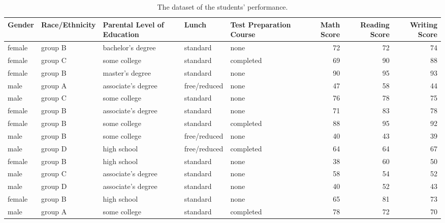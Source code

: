 \documentclass{article}
\begin{document}
	\begin{sidewaystable}[h!]
		\begin{center}
			\caption{The dataset of the students' performance.}
			\label{tab:table1}
			\begin{tabular}{|l|l|l|l|l|r|r|r|}
				\hline
				\cellcolor{blue!50}\textbf{Gender} & \cellcolor{blue!50}\cellcolor{blue!50}\textbf{Race/Ethnicity} & \cellcolor{blue!50}\textbf{Parental Level of Education} & \cellcolor{blue!50}\textbf{Lunch} & \cellcolor{blue!50}\textbf{Test Preparation Course} & \cellcolor{blue!50}\textbf{Math Score} & \cellcolor{blue!50}\textbf{Reading Score} & \cellcolor{blue!50}\textbf{Writing Score} \\
				\hline
				female & group B & bachelor's degree & standard & none & 72 & 72 & 74 \\
				\hline
				female & group C & some college & standard & completed & 69 & 90 & 88 \\
				\hline
				female & group B & master's degree & standard & none & 90 & 95 & 93 \\
				\hline
				male & group A & associate's degree & free/reduced & none & 47 & 58 & 44 \\
				\hline
				male & group C & some college & standard & none & 76 & 78 & 75 \\
				\hline
				female & group B & associate's degree & standard & none & 71 & 83 & 78 \\
				\hline
				female & group B & some college & standard & completed & 88 & 95 & 92 \\
				\hline
				male & group B & some college & free/reduced & none & 40 & 43 & 39 \\
				\hline
				male & group D & high school & free/reduced & completed & 64 & 64 & 67 \\
				\hline
				female & group B & high school & standard & none & 38 & 60 & 50 \\
				\hline
				male & group C & associate's degree & standard & none & 58 & 54 & 52 \\
				\hline
				male & group D & associate's degree & standard & none & 40 & 52 & 43 \\
				\hline
				female & group B & high school & standard & none & 65 & 81 & 73 \\
				\hline
				male & group A & some college & standard & completed & 78 & 72 & 70 \\
				\hline
			\end{tabular}
		\end{center}
	\end{sidewaystable}
\end{document}
